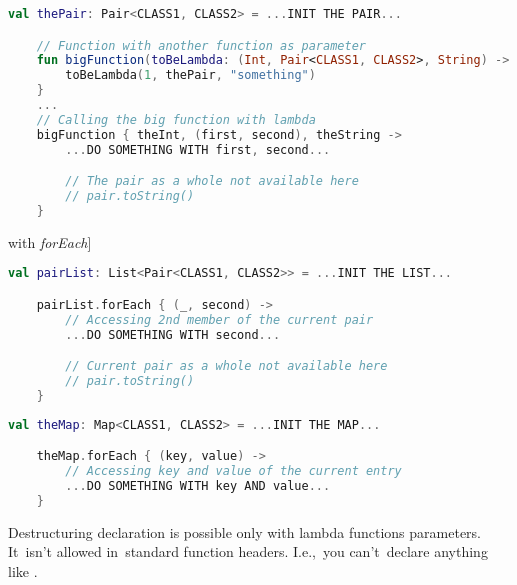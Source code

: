 \begin{lstlisting}[language=Kotlin]
    val thePair: Pair<CLASS1, CLASS2> = ...INIT THE PAIR...

    // Function with another function as parameter
    fun bigFunction(toBeLambda: (Int, Pair<CLASS1, CLASS2>, String) -> Unit) {
        toBeLambda(1, thePair, "something")
    }
    ...
    // Calling the big function with lambda
    bigFunction { theInt, (first, second), theString ->
        ...DO SOMETHING WITH first, second...

        // The pair as a whole not available here
        // pair.toString()
    }
\end{lstlisting}
\newpage

\example[alternative to~the~mentioned \hyperref[kotlindestdeclforloop]{\textit{for} loop} with \textit{forEach}]
\begin{lstlisting}[language=Kotlin]
    val pairList: List<Pair<CLASS1, CLASS2>> = ...INIT THE LIST...

    pairList.forEach { (_, second) ->
        // Accessing 2nd member of the current pair
        ...DO SOMETHING WITH second...

        // Current pair as a whole not available here
        // pair.toString()
    }
\end{lstlisting}

\begin{lstlisting}[language=Kotlin]
    val theMap: Map<CLASS1, CLASS2> = ...INIT THE MAP...

    theMap.forEach { (key, value) ->
        // Accessing key and value of the current entry
        ...DO SOMETHING WITH key AND value...
    }
\end{lstlisting}

\warning Destructuring declaration is possible only with lambda functions parameters.
It~isn't allowed in~standard function headers.
I.e.,~you can't~declare anything like .
